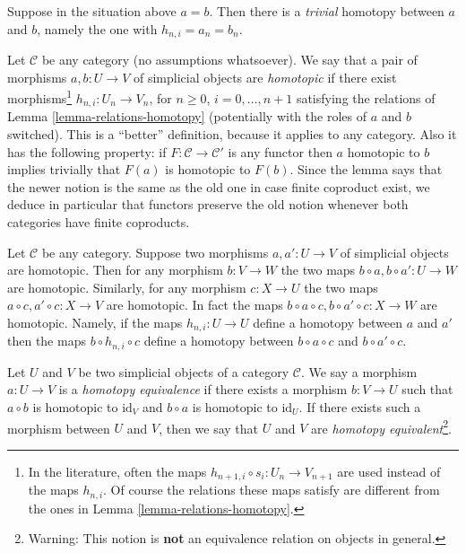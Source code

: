 \begin{example}
\label{example-trivial-homotopy}
Suppose in the situation above $a = b$. Then there is a {\it trivial}
homotopy between $a$ and $b$, namely the one with $h_{n, i} = a_n = b_n$.
\end{example}

\begin{remark}
\label{remark-homotopy-better}
Let $\mathcal{C}$ be any category (no assumptions whatsoever).
We say that a pair of morphisms $a, b : U \to V$ of simplicial
objects  are {\it homotopic} if there
exist morphisms\footnote{In the literature, often the maps
$h_{n + 1, i} \circ s_i : U_n \to V_{n + 1}$ are used instead
of the maps $h_{n, i}$. Of course the relations these maps satisfy
are different from the ones in Lemma \ref{lemma-relations-homotopy}.}
$h_{n, i} : U_n \to V_n$, for $n \geq 0$, $i = 0, \ldots, n + 1$
satisfying the relations of Lemma \ref{lemma-relations-homotopy}
(potentially with the roles of $a$ and $b$ switched).
This is a ``better'' definition, because it applies to
any category. Also it has the following property: if
$F : \mathcal{C} \to \mathcal{C}'$ is any functor
then $a$ homotopic to $b$ implies trivially that
$F(a)$ is homotopic to $F(b)$.
Since the lemma says that the newer notion is the same
as the old one in case finite coproduct exist, we deduce
in particular that functors preserve the old notion
whenever both categories have finite coproducts.
\end{remark}

\begin{remark}
\label{remark-homotopy-pre-post-compose}
Let $\mathcal{C}$ be any category. Suppose two morphisms $a, a' : U \to V$
of simplicial objects are homotopic. Then for any morphism $b : V \to W$
the two maps $b \circ a, b \circ a' : U \to W$ are homotopic.
Similarly, for any morphism $c : X \to U$ the two maps
$a \circ c, a' \circ c : X \to V$ are homotopic. In fact the maps
$b \circ a \circ c, b \circ a' \circ c : X \to W$ are homotopic.
Namely, if the maps $h_{n, i} : U \to U$ define a homotopy between
$a$ and $a'$ then the maps $b \circ h_{n, i} \circ c$ define a homotopy
between $b \circ a \circ c$ and $b \circ a' \circ c$.
\end{remark}

\begin{definition}
\label{definition-homotopy-equivalent}
Let $U$ and $V$ be two simplicial objects of a category $\mathcal{C}$.
We say a morphism $a : U \to V$ is a {\it homotopy equivalence}
if there exists a morphism $b : V \to U$
such that $a \circ b$ is homotopic to $\text{id}_V$
and $b \circ a$ is homotopic to $\text{id}_U$.
If there exists such a morphism between $U$ and $V$, then
we say that $U$ and $V$ are
{\it homotopy equivalent}\footnote{Warning: This notion is {\bf not}
an equivalence relation on objects in general.}.
\end{definition}

